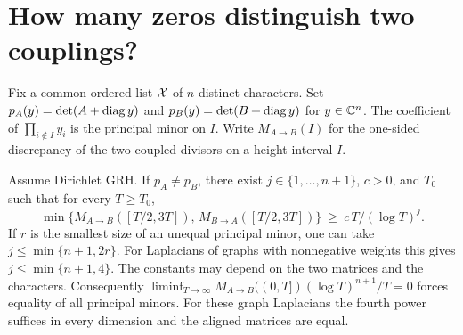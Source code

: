 \section{How many zeros distinguish two couplings?}\label{sec:couplinggap}

Fix a common ordered list $\mathcal X$ of $n$ distinct characters. Set
$p_A(y)=\det(A+\operatorname{diag} y)$ and $p_B(y)=\det(B+\operatorname{diag} y)$ for $y\in\mathbb C^n$.
The coefficient of $\prod_{i\notin I}y_i$ is the principal minor on $I$.
Write $M_{A\to B}(I)$ for the one-sided discrepancy of the two coupled
divisors on a height interval $I$.

\begin{theorem}\label{thm:couplinggap}
Assume Dirichlet GRH. If $p_A\ne p_B$, there exist $j\in\{1,\ldots,n+1\}$,
$c>0$, and $T_0$ such that for every $T\ge T_0$,
\[
 \min\{M_{A\to B}([T/2,3T]),\,M_{B\to A}([T/2,3T])\}
       \ \ge\ c\,T/(\log T)^j .
\]
If $r$ is the smallest size of an unequal principal minor, one can take
$j\le\min\{n+1,2r\}$. For Laplacians of graphs with nonnegative
weights this gives $j\le\min\{n+1,4\}$. The constants may depend on the two matrices and the
characters. Consequently $\liminf_{T\to\infty}
M_{A\to B}((0,T])(\log T)^{n+1}/T=0$ forces equality of all principal
minors. For these graph Laplacians the fourth power suffices in every
dimension and the aligned matrices are equal.
\end{theorem}

